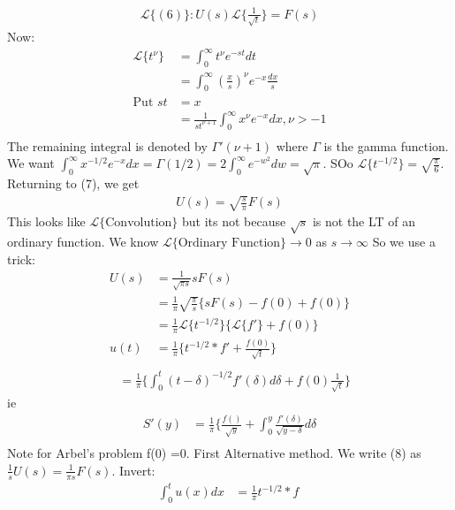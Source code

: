 \documentclass[10pt, oneside]{article}
\begin{document}
\begin{align}
    \mathscr{L}\{(6)\}  : U(s) \mathscr{L}\{\frac{1}{\sqrt{t}}\} = F(s)
\end{align}
Now:
\begin{align*}
    \mathscr{L} \{t^{\nu}\} & = \int_{0}^{\infty}t^{\nu}e^{-st}dt \\
    & = \int_{0}^{\infty}(\frac{x}{s})^{\nu}e^{-x} \frac{dx}{s} \\
    \text{Put } st & = x \\
    & = \frac{1}{st^{\nu+1}} \int_{0}^{\infty}x^{\nu}e^{-x} dx, \nu > -1\\
\end{align*}
The remaining integral is denoted by $\Gamma'(\nu+1)$ where $\Gamma$ is the gamma function. We want $\int_{0}^{\infty}x^{-1/2}e^{-x} dx = \Gamma(1/2) = 2\int_{0}^{\infty}e^{-w^{2}}dw = \sqrt{\pi}$. SOo $\mathscr{L}\{t^{-1/2} \} = \sqrt{\frac{\pi}{6}}$.
Returning to (7), we get 
\begin{align}
    U(s) =\sqrt{\frac{s}{\pi}}F(s)
\end{align}
This looks like $\mathscr{L}\{ \text{Convolution}\} $ but its not because $\sqrt{s}$ is not the LT of an ordinary function. We know $\mathscr{L} \{\text{Ordinary Function}\} \to 0$ as $s \to \infty$ So we use a trick:
\begin{align*}
    U(s)&= \frac{1}{\sqrt{\pi s}}sF(s) \\
    &=\frac{1}{\pi} \sqrt{\frac{\pi}{s}}\{sF(s) -f(0) + f(0)\}\\
    &=\frac{1}{\pi} \mathscr{L}\{t^{-1/2}\} \{\mathscr{L} \{f'\} + f(0)\} \\
    u(t) &= \frac{1}{\pi} \{t^{-1/2} * f'+\frac{f(0)}{\sqrt{t}}\} \\
\end{align*}
\begin{align}
    &= \frac{1}{\pi}\{ \int_{0}^{t}(t-\delta)^{-1/2} f'(\delta)d\delta +f(0)\frac{1}{\sqrt{t}}\} 
\end{align}
ie 
\begin{align*}
    S'(y) & = \frac{1}{\pi}\{ \frac{f()}{\sqrt{y}} + \int_{0}^{y}\frac{f'(\delta)}{\sqrt{y-\delta}}d\delta \\
\end{align*}
Note for Arbel's problem f(0) =0.
First Alternative method.  We write (8) as $\frac{1}{s} U(s) =\frac{1}{\pi s} F(s)$. Invert:
\begin{align}
    \int_{0}^{t}u(x) dx & = \frac{1}{\pi} t^{-1/2} * f \
\end{align}
\end{document}
